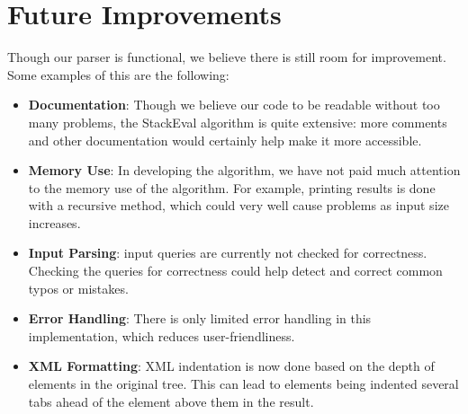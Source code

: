 \documentclass[11pt]{article}
\begin{document}
\section{Future Improvements}
Though our parser is functional, we believe there is still room for improvement. Some examples of this are the following:
\begin{itemize}
\item \textbf{Documentation}: Though we believe our code to be readable without too many problems, the StackEval algorithm is quite extensive: more comments and other documentation would certainly help make it more accessible.
\item \textbf{Memory Use}: In developing the algorithm, we have not paid much attention to the memory use of the algorithm. For example, printing results is done with a recursive method, which could very well cause problems as input size increases.
\item \textbf{Input Parsing}: input queries are currently not checked for correctness. Checking the queries for correctness could help detect and correct common typos or mistakes.
\item \textbf{Error Handling}: There is only limited error handling in this implementation, which reduces user-friendliness.
\item \textbf{XML Formatting}: XML indentation is now done based on the depth of elements in the original tree. This can lead to elements being indented several tabs ahead of the element above them in the result.
\end{itemize}

\newpage
\lstlistoflistings



\end{document}
